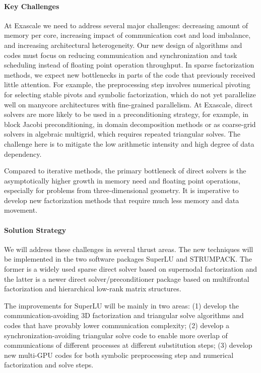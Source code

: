 \paragraph{Key Challenges}
At Exascale we need to address several major challenges:
decreasing amount of memory per core, increasing impact of communication
cost and load imbalance, and increasing architectural heterogeneity.
Our new design of algorithms and codes must focus on
reducing communication and synchronization and task scheduling 
instead of floating point operation throughput. In sparse factorization
methods, we expect new bottlenecks in parts of the code
that previously received little attention. For example, the preprocessing
step involves numerical pivoting for selecting stable pivots and
symbolic factorization, which do not yet parallelize well on manycore
architectures with fine-grained parallelism.
At Exascale, direct solvers are more likely to
be used in a preconditioning strategy, for example, in block Jacobi
preconditioning, in domain decomposition methods or as coarse-grid
solvers in algebraic multigrid, which requires repeated triangular
solves. The challenge here is to mitigate the low arithmetic intensity
and high degree of data dependency.

Compared to iterative methods, the primary bottleneck of direct solvers
is the asymptotically higher growth in memory need and floating point
operations, especially for problems from three-dimensional geometry.
It is imperative to develop new factorization methods that require
much less memory and data movement.


\paragraph{Solution Strategy}
We will address these challenges in several thrust areas.
The new techniques will be implemented in the two software packages SuperLU
and STRUMPACK. The former is a widely used sparse direct solver based on
supernodal factorization and the latter is a newer direct
solver/preconditioner package based on multifrontal factorization 
and hierarchical low-rank matrix structures.

The improvements for SuperLU will be mainly in two areas: (1) develop
the communication-avoiding 3D factorization and triangular solve
algorithms and codes that have provably lower communication complexity;
(2) develop a synchronization-avoiding triangular solve code to enable more
overlap of communications of different processes at different substitution steps;
(3) develop new multi-GPU codes for both symbolic preprocessing step and
numerical factorization and solve steps.

